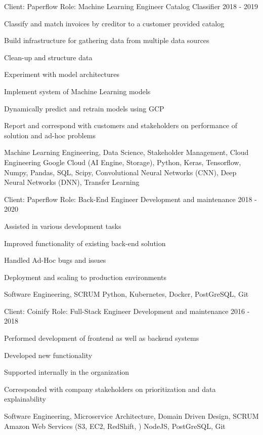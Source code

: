 \begin{cventries}
\cventry
{Client: Paperflow \newline Role: Machine Learning Engineer} %
{Catalog Classifier} %
{}%
{2018 - 2019} %
{ %
\begin{cvitems}
    \item {Classify and match invoices by creditor to a customer provided catalog}
    \item {Build infrastructure for gathering data from multiple data sources}
    \item {Clean-up and structure data}
    \item {Experiment with model architectures}
    \item {Implement system of Machine Learning models}
    \item {Dynamically predict and retrain models using GCP}
    \item {Report and correspond with customers and stakeholders on performance of solution and ad-hoc problems}
\end{cvitems}
\cventrykeywords
{Machine Learning Engineering, Data Science, Stakeholder Management, Cloud Engineering}
{Google Cloud (AI Engine, Storage), Python, Keras, Tensorflow, Numpy, Pandas, SQL, Scipy, Convolutional Neural Networks (CNN), Deep Neural Networks (DNN), Transfer Learning}
}

\cventry
{Client: Paperflow \newline Role: Back-End Engineer} %
{Development and maintenance} %
{}%
{2018 - 2020} %
{ %
\begin{cvitems}
    \item {Assisted in various development tasks}
    \item {Improved functionality of existing back-end solution}
    \item {Handled Ad-Hoc bugs and issues}
    \item {Deployment and scaling to production environments}
\end{cvitems}
\cventrykeywords
{Software Engineering, SCRUM}
{Python, Kubernetes, Docker, PostGreSQL, Git}
}

\cventry
{Client: Coinify \newline Role: Full-Stack Engineer} %
{Development and maintenance} %
{}%
{2016 - 2018} %
{ %
\begin{cvitems}
    \item {Performed development of frontend as well as backend systems}
    \item {Developed new functionality}
    \item {Supported internally in the organization}
    \item {Corresponded with company stakeholders on prioritization and data explainability}
\end{cvitems}
\cventrykeywords
{Software Engineering, Microservice Architecture, Domain Driven Design, SCRUM}
{Amazon Web Services (S3, EC2, RedShift, ) NodeJS, PostGreSQL, Git}
}


\end{cventries}

